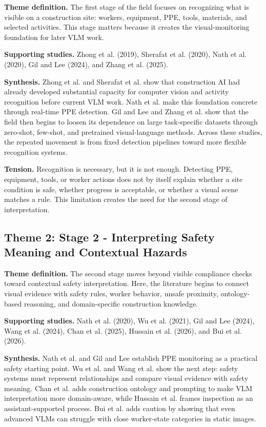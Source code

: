 \documentclass[10pt, letterpaper]{article}
\begin{document}
\textbf{Theme definition.} The first stage of the field focuses on recognizing what is visible on a construction site: workers, equipment, PPE, tools, materials, and selected activities. This stage matters because it creates the visual-monitoring foundation for later VLM work.

\textbf{Supporting studies.} Zhong et al. (2019), Sherafat et al. (2020), Nath et al. (2020), Gil and Lee (2024), and Zhang et al. (2025).

\textbf{Synthesis.} Zhong et al. and Sherafat et al. show that construction AI had already developed substantial capacity for computer vision and activity recognition before current VLM work. Nath et al. make this foundation concrete through real-time PPE detection. Gil and Lee and Zhang et al. show that the field then begins to loosen its dependence on large task-specific datasets through zero-shot, few-shot, and pretrained visual-language methods. Across these studies, the repeated movement is from fixed detection pipelines toward more flexible recognition systems.

\textbf{Tension.} Recognition is necessary, but it is not enough. Detecting PPE, equipment, tools, or worker actions does not by itself explain whether a site condition is safe, whether progress is acceptable, or whether a visual scene matches a rule. This limitation creates the need for the second stage of interpretation.

\subsection{Theme 2: Stage 2 - Interpreting Safety Meaning and Contextual Hazards}

\textbf{Theme definition.} The second stage moves beyond visible compliance checks toward contextual safety interpretation. Here, the literature begins to connect visual evidence with safety rules, worker behavior, unsafe proximity, ontology-based reasoning, and domain-specific construction knowledge.

\textbf{Supporting studies.} Nath et al. (2020), Wu et al. (2021), Gil and Lee (2024), Wang et al. (2024), Chan et al. (2025), Hussain et al. (2026), and Bui et al. (2026).

\textbf{Synthesis.} Nath et al. and Gil and Lee establish PPE monitoring as a practical safety starting point. Wu et al. and Wang et al. show the next step: safety systems must represent relationships and compare visual evidence with safety meaning. Chan et al. adds construction ontology and prompting to make VLM interpretation more domain-aware, while Hussain et al. frames inspection as an assistant-supported process. Bui et al. adds caution by showing that even advanced VLMs can struggle with close worker-state categories in static images.
\end{document}
